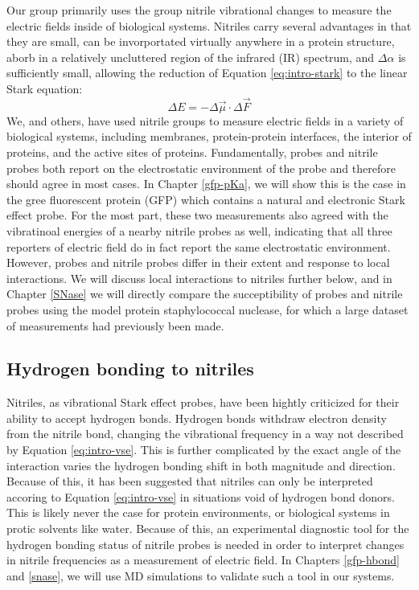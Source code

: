 Our group primarily uses the group nitrile vibrational changes to measure the electric fields inside of biological systems. 
Nitriles carry several advantages in that they are small, can be invorportated virtually anywhere in a protein structure, aborb in a relatively uncluttered region of the infrared (IR) spectrum, and $\Delta \alpha$ is sufficiently small, allowing the reduction of Equation \ref{eq:intro-stark} to the linear Stark equation: 
\begin{equation} 
    \Delta E = - \Delta \vec{\mu} \cdot \Delta \vec{F}
    \label{eq:intro-vse}
\end{equation}
We, and others, have used nitrile groups to measure electric fields in a variety of biological systems, including membranes, protein-protein interfaces, the interior of proteins, and the active sites of proteins. 
Fundamentally, \pKa{} probes and nitrile probes both report on the electrostatic environment of the probe and therefore should agree in most cases. 
In Chapter \ref{gfp-pKa}, we will show this is the case in the gree fluorescent protein (GFP) which contains a natural \pKa{} and electronic Stark effect probe. 
For the most part, these two measurements also agreed with the vibratinoal energies of a nearby nitrile probes as well, indicating that all three reporters of electric field do in fact report the same electrostatic environment. 
However, \pKa{} probes and nitrile probes differ in their extent and response to local interactions. 
We will discuss local interactions to nitriles further below, and in Chapter \ref{SNase} we will directly compare the succeptibility of \pKa{} probes and nitrile probes using the model protein staphylococcal nuclease, for which a large dataset of \pKa{} measurements had previously been made. 

\subsection{Hydrogen bonding to nitriles} 

Nitriles, as vibrational Stark effect probes, have been hightly criticized for their ability to accept hydrogen bonds. 
Hydrogen bonds withdraw electron density from the nitrile bond, changing the vibrational frequency in a way not described by Equation \ref{eq:intro-vse}. 
This is further complicated by the exact angle of the interaction varies the hydrogen bonding shift in both magnitude and direction.  
Because of this, it has been suggested that nitriles can only be interpreted accoring to Equation \ref{eq:intro-vse} in situations void of hydrogen bond donors. 
This is likely never the case for protein environments, or biological systems in protic solvents like water. 
Because of this, an experimental diagnostic tool for the hydrogen bonding status of nitrile probes is needed in order to interpret changes in nitrile frequencies as a measurement of electric field. 
In Chapters \ref{gfp-hbond} and \ref{snase}, we will use MD simulations to validate such a tool in our systems.  

